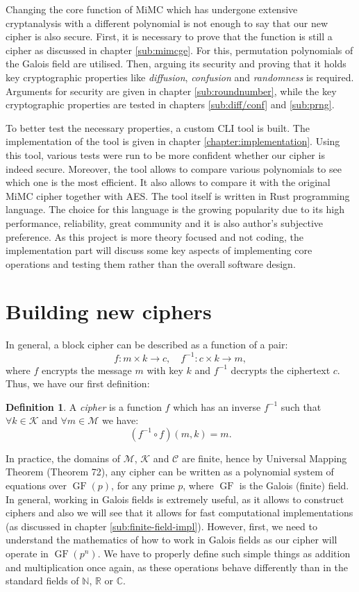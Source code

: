 \documentclass{Resources/UoBLab1}
\theoremstyle{definition}
\newtheorem{definition}[theorem]{Definition}
\begin{document}
Changing the core function of MiMC which has undergone extensive cryptanalysis with a different polynomial is not enough to say that our new cipher is also secure. First, it is necessary to prove that the function is still a cipher as discussed in chapter \ref{sub:mimcge}. For this, permutation polynomials of the Galois field are utilised. Then, arguing its security and proving that it holds key cryptographic properties like \textit{diffusion}, \textit{confusion} and \textit{randomness} is required. Arguments for security are given in chapter \ref{sub:roundnumber}, while the key cryptographic properties are tested in chapters \ref{sub:diff/conf} and \ref{sub:prng}.

To better test the necessary properties, a custom CLI tool is built. The implementation of the tool is given in chapter \ref{chapter:implementation}. Using this tool, various tests were run to be more confident whether our cipher is indeed secure. Moreover, the tool allows to compare various polynomials to see which one is the most efficient. It also allows to compare it with the original MiMC cipher together with AES. The tool itself is written in Rust programming language. The choice for this language is the growing popularity due to its high performance, reliability, great community and it is also author's subjective preference. As this project is more theory focused and not coding, the implementation part will discuss some key aspects of implementing core operations and testing them rather than the overall software design.


\section{Building new ciphers}
In general, a block cipher can be described as a function of a pair:
\[
f : m \times k \to c,\quad f^{-1} : c \times k \to m,
\]
where $f$ encrypts the message $m$ with key $k$ and $f^{-1}$ decrypts the ciphertext $c$. Thus, we have our first definition:
\begin{definition}\label{def:cipher}
    A \textit{cipher} is a function $f$ which has an inverse $f^{-1}$ such that \(\forall k \in \mathcal{K}\) and \(\forall m \in \mathcal{M}\) we have:
    \[
        (f^{-1} \circ f)(m, k) = m.
    \]
\end{definition}
In practice, the domains of $\mathcal{M}$, $\mathcal{K}$ and $\mathcal{C}$ are finite, hence by Universal Mapping Theorem (Theorem 72\cite{CryptanalysisBook}), any cipher can be written as a polynomial system of equations over $\operatorname{GF}(p)$, for any prime $p$, where $\operatorname{GF}$ is the Galois (finite) field. In general, working in Galois fields is extremely useful, as it allows to construct ciphers and also we will see that it allows for fast computational implementations (as discussed in chapter \ref{sub:finite-field-impl}). However, first, we need to understand the mathematics of how to work in Galois fields as our cipher will operate in $\operatorname{GF}(p^n)$. We have to properly define such simple things as addition and multiplication once again, as these operations behave differently than in the standard fields of $\mathbb{N}$, $\mathbb{R}$ or $\mathbb{C}$.
\end{document}
